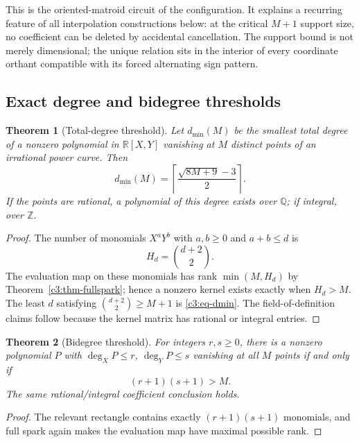 \documentclass[11pt,oneside]{article}
\newtheorem{theorem}{Theorem}[section]
\theoremstyle{definition}
\theoremstyle{remark}
\newcommand{\Z}{\mathbb Z}
\newcommand{\Q}{\mathbb Q}
\newcommand{\R}{\mathbb R}
\begin{document}
This is the oriented-matroid circuit of the configuration.  It explains a recurring feature
of all interpolation constructions below: at the critical $M+1$ support size, no coefficient
can be deleted by accidental cancellation.  The support bound is not merely dimensional; the
unique relation sits in the interior of every coordinate orthant compatible with its forced
alternating sign pattern.

\subsection{Exact degree and bidegree thresholds}

\begin{theorem}[Total-degree threshold]
\label{c3:thm-degree-threshold}
Let $d_{\min}(M)$ be the smallest total degree of a nonzero polynomial in $\R[X,Y]$ vanishing
at $M$ distinct points of an irrational power curve.  Then
\begin{equation}
 d_{\min}(M)=
 \left\lceil\frac{\sqrt{8M+9}-3}{2}\right\rceil.
 \label{c3:eq-dmin}
\end{equation}
If the points are rational, a polynomial of this degree exists over $\Q$; if integral, over
$\Z$.
\end{theorem}

\begin{proof}
The number of monomials $X^aY^b$ with $a,b\ge0$ and $a+b\le d$ is
\[
 H_d=\binom{d+2}{2}.
\]
The evaluation map on these monomials has rank $\min(M,H_d)$ by
Theorem~\ref{c3:thm-fullspark}; hence a nonzero kernel exists exactly when $H_d>M$.  The least
$d$ satisfying $\binom{d+2}{2}\ge M+1$ is \eqref{c3:eq-dmin}.  The field-of-definition
claims follow because the kernel matrix has rational or integral entries.
\end{proof}

\begin{theorem}[Bidegree threshold]
\label{c3:thm-bidegree-threshold}
For integers $r,s\ge0$, there is a nonzero polynomial $P$ with
$\deg_XP\le r$, $\deg_YP\le s$ vanishing at all $M$ points if and only if
\begin{equation}
 (r+1)(s+1)>M.
 \label{c3:eq-bidegree}
\end{equation}
The same rational/integral coefficient conclusion holds.
\end{theorem}

\begin{proof}
The relevant rectangle contains exactly $(r+1)(s+1)$ monomials, and full spark again makes
the evaluation map have maximal possible rank.
\end{proof}
\end{document}
